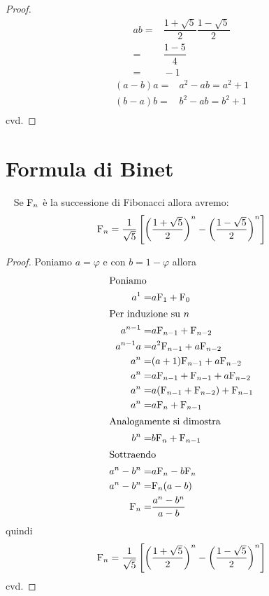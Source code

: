 \begin{proof}
	\begin{align*}
		ab=&{}\dfrac{1+\sqrt{5}}{2}\dfrac{1-\sqrt{5}}{2}\\
		=&{}\dfrac{1-5}{4}\\
		=&{}-1
	\end{align*}
	\begin{align*}
		(a-b)a=&{}a^2-ab=a^2+1\\
		(b-a)b=&{}b^2-ab=b^2+1\\
	\end{align*}
	cvd.
\end{proof}
\section{Formula di Binet}
\begin{thm}~\cite{Conti2020}\label{thm:FibFormulaBinet}
	Se $\mathrm{F}_{n}$ è la successione di Fibonacci allora avremo:
	\begin{equation}
		\mathrm{F}_{n}=\dfrac{1}{\sqrt{5}}\left[\left(\dfrac{1+\sqrt{5}}{2}\right)^n-\left(\dfrac{1-\sqrt{5}}{2}\right)^n\right]
	\end{equation}\label{eqn:FinBinet}
\end{thm}
\begin{proof}
	Poniamo $a=\varphi$ e con $b=1-\varphi$ allora
	\begin{align*}
		\intertext{Poniamo}
		a^1=&{}a\mathrm{F}_{1}+\mathrm{F}_{0}\\
		\intertext{Per induzione su $n$}
		a^{n-1}=&{}a\mathrm{F}_{n-1}+\mathrm{F}_{n-2}\\
		a^{n-1}a=&{}a^2\mathrm{F}_{n-1}+a\mathrm{F}_{n-2}\\
		a^{n}=&{}(a+1)\mathrm{F}_{n-1}+a\mathrm{F}_{n-2}\\
		a^{n}=&{}a\mathrm{F}_{n-1}+\mathrm{F}_{n-1}+a\mathrm{F}_{n-2}\\
		a^{n}=&{}a(\mathrm{F}_{n-1}+\mathrm{F}_{n-2})+\mathrm{F}_{n-1}\\
		a^{n}=&{}a\mathrm{F}_{n}+\mathrm{F}_{n-1}\\
		\intertext{Analogamente si dimostra}
		b^{n}=&{}b\mathrm{F}_{n}+\mathrm{F}_{n-1}\\
		\intertext{Sottraendo}
		a^n-b^n=&{}a\mathrm{F}_{n}-b\mathrm{F}_{n}\\
		a^n-b^n=&{}\mathrm{F}_{n}(a-b)\\
		\mathrm{F}_{n}=&{}\dfrac{a^n-b^n}{a-b}
	\end{align*}
quindi
\begin{equation}
\mathrm{F}_{n}=\dfrac{1}{\sqrt{5}}\left[\left(\dfrac{1+\sqrt{5}}{2}\right)^n-\left(\dfrac{1-\sqrt{5}}{2}\right)^n\right]
\end{equation}
cvd.
\end{proof}
